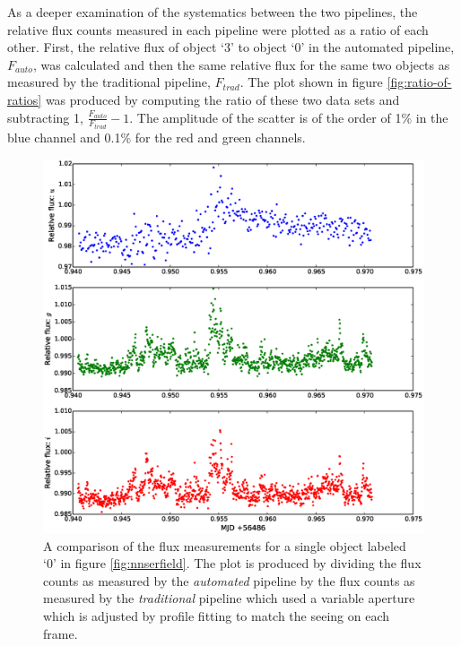 As a deeper examination of the systematics between the two pipelines, the relative flux counts measured in each pipeline were plotted as a ratio of each other. First, the relative flux of object `3' to object `0' in the automated pipeline, $F_{auto}$, was calculated and then the same relative flux for the same two objects as measured by the traditional pipeline, $F_{trad}$. The plot shown in figure  \ref{fig:ratio-of-ratios} was produced by computing the ratio of these two data sets and subtracting 1,  $\frac{F_{auto}}{F_{trad}} - 1$. The amplitude of the scatter is of the order of 1\% in the blue channel and 0.1\% for the red and green channels. 

\begin{figure}
\centering
\includegraphics[width=140mm]{images/compare_photometry.eps}
\caption{A comparison of the flux measurements for a single object labeled `0' in figure \ref{fig:nnserfield}. The plot is produced by dividing the flux counts as measured by the \emph{automated} pipeline by the flux counts as measured by the \emph{traditional} pipeline which used a variable aperture which is adjusted by profile fitting to match the seeing on each frame.}
\label{fig:comparephotometry}
\end{figure}

